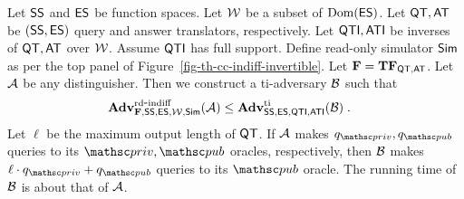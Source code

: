 \begin{theorem}\label{th-cc-indiff-invertible}  Let $\mathsf{SS}$ and $\mathsf{ES}$ be function spaces. Let ${\cal W}$ be a subset of $\mathrm{Dom}(\mathsf{ES})$.
	Let $\mathsf{QT},\mathsf{AT}$ be $(\mathsf{SS},\mathsf{ES})$ query and answer translators, respectively. Let $\mathsf{QTI},\mathsf{ATI}$ be inverses of $\mathsf{QT},\mathsf{AT}$ over ${\cal W}$. Assume $\mathsf{QTI}$ has full support. Define read-only simulator $\mathsf{Sim}$ as per the top panel of Figure~\ref{fig-th-cc-indiff-invertible}.
	Let $\mathbf{F} = \mathbf{TF}_{\mathsf{QT},\mathsf{AT}}$. Let $\mathcal{A}$ be any distinguisher.  Then we construct a ti-adversary $\mathcal{B}$ such that
	\begin{align*}
	\mathbf{Adv}^{\mathrm{rd\mbox{-}indiff}}_{\mathbf{F},\mathsf{SS},\mathsf{ES},{\cal W},\mathsf{Sim}}(\mathcal{A})  & \leq \mathbf{Adv}^{\mathrm{ti}}_{\mathsf{SS},\mathsf{ES},\mathsf{QTI},\mathsf{ATI}}(\mathcal{B}) \;.
	\end{align*}
	Let $\ell$ be the maximum output length of $\mathsf{QT}$. 
	If $\mathcal{A}$ makes $q_{\priv},q_{\pub}$ queries to its $\priv,\pub$ oracles, respectively, then $\mathcal{B}$ makes $\ell\cdot q_{\priv}+q_{\pub}$ queries to its $\pub$ oracle. The running time of $\mathcal{B}$ is about that of $\mathcal{A}$. 
\end{theorem}
